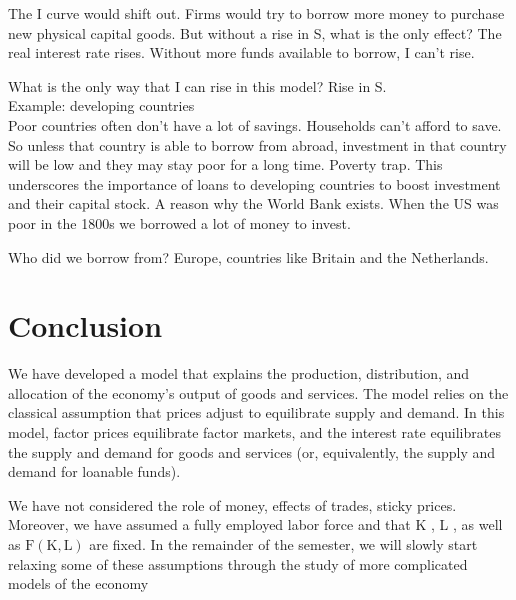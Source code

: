 \documentclass[10pt]{article}
\begin{document}
The I curve would shift out. Firms would try to borrow more money to purchase new physical capital goods. But without a rise in S, what is the only effect? The real interest rate rises. Without more funds available to borrow, I can't rise.

What is the only way that I can rise in this model? Rise in S.\\
Example: developing countries\\
Poor countries often don't have a lot of savings. Households can't afford to save. So unless that country is able to borrow from abroad, investment in that country will be low and they may stay poor for a long time. Poverty trap. This underscores the importance of loans to developing countries to boost investment and their capital stock. A reason why the World Bank exists. When the US was poor in the 1800s we borrowed a lot of money to invest.

Who did we borrow from? Europe, countries like Britain and the Netherlands.

\section*{Conclusion}
We have developed a model that explains the production, distribution, and allocation of the economy's output of goods and services. The model relies on the classical assumption that prices adjust to equilibrate supply and demand. In this model, factor prices equilibrate factor markets, and the interest rate equilibrates the supply and demand for goods and services (or, equivalently, the supply and demand for loanable funds).

We have not considered the role of money, effects of trades, sticky prices. Moreover, we have assumed a fully employed labor force and that K , L , as well as $\mathrm{F}(\mathrm{K}, \mathrm{L})$ are fixed. In the remainder of the semester, we will slowly start relaxing some of these assumptions through the study of more complicated models of the economy
\end{document}
